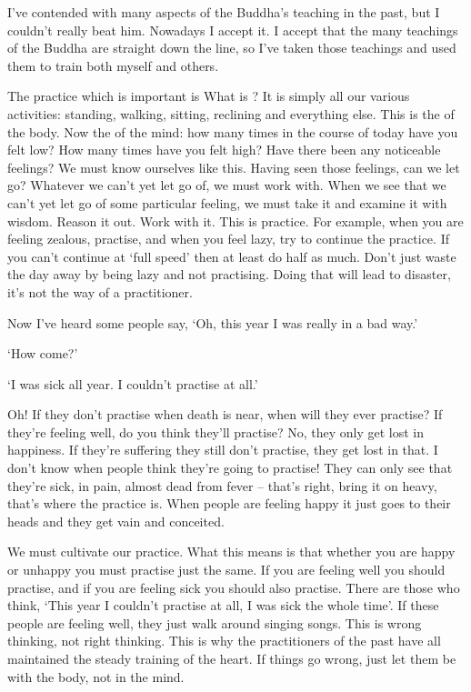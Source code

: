 I've contended with many aspects of the Buddha's teaching in the past, but I couldn't really beat him. Nowadays I accept it. I accept that the many teachings of the Buddha are straight down the line, so I've taken those teachings and used them to train both myself and others. 

The practice which is important is  What is ? It is simply all our various activities: standing, walking, sitting, reclining and everything else. This is the  of the body. Now the  of the mind: how many times in the course of today have you felt low? How many times have you felt high? Have there been any noticeable feelings? We must know ourselves like this. Having seen those feelings, can we let go? Whatever we can't yet let go of, we must work with. When we see that we can't yet let go of some particular feeling, we must take it and examine it with wisdom. Reason it out. Work with it. This is practice. For example, when you are feeling zealous, practise, and when you feel lazy, try to continue the practice. If you can't continue at `full speed' then at least do half as much. Don't just waste the day away by being lazy and not practising. Doing that will lead to disaster, it's not the way of a practitioner. 

Now I've heard some people say, `Oh, this year I was really in a bad way.' 

`How come?' 

`I was sick all year. I couldn't practise at all.' 

Oh! If they don't practise when death is near, when will they ever practise? If they're feeling well, do you think they'll practise? No, they only get lost in happiness. If they're suffering they still don't practise, they get lost in that. I don't know when people think they're going to practise! They can only see that they're sick, in pain, almost dead from fever -- that's right, bring it on heavy, that's where the practice is. When people are feeling happy it just goes to their heads and they get vain and conceited. 

We must cultivate our practice. What this means is that whether you are happy or unhappy you must practise just the same. If you are feeling well you should practise, and if you are feeling sick you should also practise. There are those who think, `This year I couldn't practise at all, I was sick the whole time'. If these people are feeling well, they just walk around singing songs. This is wrong thinking, not right thinking. This is why the practitioners of the past have all maintained the steady training of the heart. If things go wrong, just let them be with the body, not in the mind. 

